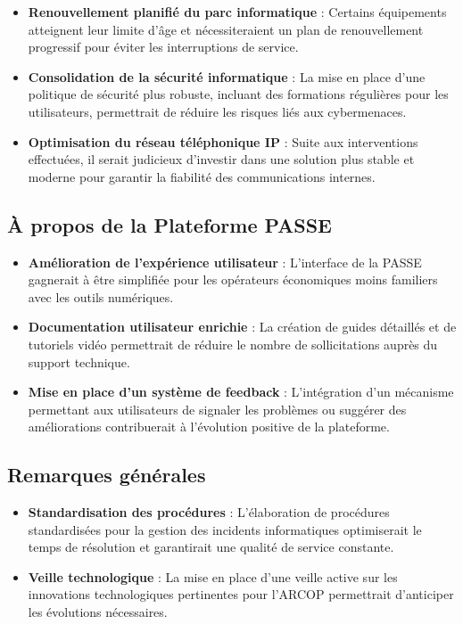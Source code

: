 \begin{itemize}
    \item \textbf{Renouvellement planifié du parc informatique} : Certains équipements atteignent leur limite d'âge et nécessiteraient un plan de renouvellement progressif pour éviter les interruptions de service.
    
    \item \textbf{Consolidation de la sécurité informatique} : La mise en place d'une politique de sécurité plus robuste, incluant des formations régulières pour les utilisateurs, permettrait de réduire les risques liés aux cybermenaces.
    
    \item \textbf{Optimisation du réseau téléphonique IP} : Suite aux interventions effectuées, il serait judicieux d'investir dans une solution plus stable et moderne pour garantir la fiabilité des communications internes.
\end{itemize}



\subsection{À propos de la Plateforme PASSE}

\begin{itemize}
    \item \textbf{Amélioration de l'expérience utilisateur} : L'interface de la PASSE gagnerait à être simplifiée pour les opérateurs économiques moins familiers avec les outils numériques.
    
    \item \textbf{Documentation utilisateur enrichie} : La création de guides détaillés et de tutoriels vidéo permettrait de réduire le nombre de sollicitations auprès du support technique.
    
    \item \textbf{Mise en place d'un système de feedback} : L'intégration d'un mécanisme permettant aux utilisateurs de signaler les problèmes ou suggérer des améliorations contribuerait à l'évolution positive de la plateforme.
\end{itemize}

\subsection{Remarques générales}

\begin{itemize}
    \item \textbf{Standardisation des procédures} : L'élaboration de procédures standardisées pour la gestion des incidents informatiques optimiserait le temps de résolution et garantirait une qualité de service constante.
    
    \item \textbf{Veille technologique} : La mise en place d'une veille active sur les innovations technologiques pertinentes pour l'ARCOP permettrait d'anticiper les évolutions nécessaires.
\end{itemize}

